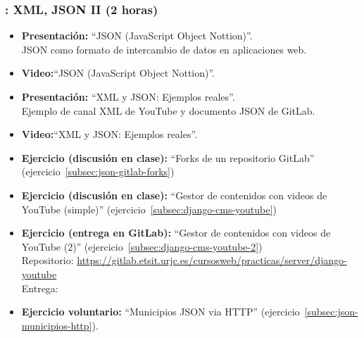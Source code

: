 \documentclass[a4paper,12pt]{article}
\begin{document}
\subsubsection{\lunesK: XML, JSON II (2 horas)}
\label{cal:lunesK}

\begin{itemize}
\item \textbf{Presentación:} ``JSON (JavaScript Object Nottion)''. \\
  JSON como formato de intercambio de datos en aplicaciones web.
\item \textbf{Video:}``JSON (JavaScript Object Nottion)''.
\item \textbf{Presentación:} ``XML y JSON: Ejemplos reales''. \\
  Ejemplo de canal XML de YouTube y documento JSON de GitLab.
\item \textbf{Video:}``XML y JSON: Ejemplos reales''.
\item \textbf{Ejercicio (discusión en clase):} ``Forks de un repositorio GitLab''
  (ejercicio~\ref{subsec:json-gitlab-forks})
\item \textbf{Ejercicio (discusión en clase):} ``Gestor de contenidos con videos de YouTube (simple)'' (ejercicio~\ref{subsec:django-cms-youtube})
\item \textbf{Ejercicio (entrega en GitLab):} ``Gestor de contenidos con videos de YouTube (2)'' (ejercicio~\ref{subsec:django-cms-youtube-2}) \\
  Repositorio: \url{https://gitlab.etsit.urjc.es/cursosweb/practicas/server/django-youtube} \\
  Entrega: \juevesN
\item \textbf{Ejercicio voluntario:} ``Municipios JSON via HTTP'' (ejercicio~\ref{subsec:json-municipios-http}).
\end{itemize}

\end{document}
